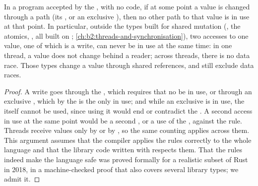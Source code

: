 \begin{proposition}\label{prop:b2:rust-ownership:no-race}
In a program accepted by the , with no  code, if at some point a value is changed through
a path (its , or an exclusive ), then no other path to that value is in use at that point. In particular,
outside the types built for shared mutation (, the atomics, , all built on ;
\cref{ch:b2:threads-and-synchronisation}), two accesses to one value, one of which is a write, can never be in use at
the same time: in one thread, a value does not change behind a reader; across threads, there is no data race. Those
types change a value through shared references, and still exclude data races.
\end{proposition}

\begin{proof}
A write goes through the , which requires that no  be in use, or through an exclusive , which by the
 is the only  in use; and while an exclusive  is in use, the  itself cannot be used,
since using it would end or contradict the . A second access in use at the same point would be a second
, or a use of the , against the rule. Threads receive values only by  or by , so the same
counting applies across them. This argument assumes that the compiler applies the rules correctly to the whole
language and that the library code written with  respects them. That the rules indeed make the language
safe was proved formally for a realistic subset of Rust in 2018, in a machine-checked proof that also covers
several library types; we admit it.
\end{proof}

\label{lst:b2:rust-ownership:race}

